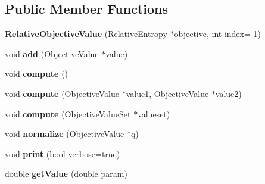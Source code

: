 \subsection*{Public Member Functions}
\begin{DoxyCompactItemize}
\item 
\hypertarget{classRelativeObjectiveValue_a0cfe8e9aa6d2b5cbeca876cf16d5dd68}{{\bfseries Relative\-Objective\-Value} (\hyperlink{classRelativeEntropy}{Relative\-Entropy} $\ast$objective, int index=-\/1)}\label{classRelativeObjectiveValue_a0cfe8e9aa6d2b5cbeca876cf16d5dd68}

\item 
\hypertarget{classRelativeObjectiveValue_a7587c68ff0d7cba1d403824190493ab3}{void {\bfseries add} (\hyperlink{classObjectiveValue}{Objective\-Value} $\ast$value)}\label{classRelativeObjectiveValue_a7587c68ff0d7cba1d403824190493ab3}

\item 
\hypertarget{classRelativeObjectiveValue_af843a108184fffc1dbf42da6e4f68797}{void {\bfseries compute} ()}\label{classRelativeObjectiveValue_af843a108184fffc1dbf42da6e4f68797}

\item 
\hypertarget{classRelativeObjectiveValue_a9bbf0956cb2162f392487617563e40a0}{void {\bfseries compute} (\hyperlink{classObjectiveValue}{Objective\-Value} $\ast$value1, \hyperlink{classObjectiveValue}{Objective\-Value} $\ast$value2)}\label{classRelativeObjectiveValue_a9bbf0956cb2162f392487617563e40a0}

\item 
\hypertarget{classRelativeObjectiveValue_a25bca07f2785b8d2f925ca684566a66e}{void {\bfseries compute} (Objective\-Value\-Set $\ast$valueset)}\label{classRelativeObjectiveValue_a25bca07f2785b8d2f925ca684566a66e}

\item 
\hypertarget{classRelativeObjectiveValue_ac89fde7d4f6c8d63fb11f3fe48291f4a}{void {\bfseries normalize} (\hyperlink{classObjectiveValue}{Objective\-Value} $\ast$q)}\label{classRelativeObjectiveValue_ac89fde7d4f6c8d63fb11f3fe48291f4a}

\item 
\hypertarget{classRelativeObjectiveValue_ab8bb9d1464729e1b56a3d25a332e67b0}{void {\bfseries print} (bool verbose=true)}\label{classRelativeObjectiveValue_ab8bb9d1464729e1b56a3d25a332e67b0}

\item 
\hypertarget{classRelativeObjectiveValue_a85d36e917e1fef32dd11a657cb210d94}{double {\bfseries get\-Value} (double param)}\label{classRelativeObjectiveValue_a85d36e917e1fef32dd11a657cb210d94}

\end{DoxyCompactItemize}
